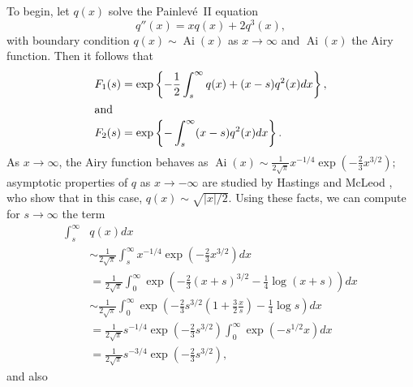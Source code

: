 \documentclass[final]{IEEEtran} %
\newcommand{\half}{\frac{1}{2}}
\DeclareMathOperator*{\Ai}{Ai}
\begin{document}
To begin, let $q(x)$ solve the Painlev\'e~II equation
\[
    q''(x) = x q(x) + 2 q^3(x),
\]
with boundary condition $q(x) \sim \Ai(x)$ as $x \to \infty$ and $\Ai(x)$ the Airy function. Then it follows that
\begin{align*}
    F_1(s)
        &= \exp \left\{
            -\half \int_s^\infty q(x) + (x - s) q^2(x) dx
        \right\}, \\
\intertext{and}
    F_2(s)
        &= \exp \left\{
            - \int_s^\infty (x - s) q^2(x) dx
        \right\}.
\end{align*}
As $x \to \infty$, the Airy function behaves as
\(
    \Ai(x)
        \sim \frac{1}{2\sqrt{\pi}} x^{-1/4}
             \exp \left( -\frac{2}{3} x^{3/2} \right);
\)
asymptotic properties of $q$ as $x \to -\infty$ are studied by Hastings and McLeod \cite{hastings1980bvp}, who show that in this case,
\(
    q(x) \sim \sqrt{ |x| / 2 }.
\)
Using these facts, we can compute for $s \to \infty$ the term
\begin{align*}
    \int_s^\infty & q(x) dx \\
        & \sim \frac{1}{2 \sqrt{\pi}}
              \int_s^\infty
                   x^{-1/4} \exp\left( -\frac{2}{3} x^{3/2} \right) dx \\
        &= \frac{1}{2 \sqrt{\pi}}
           \int_0^\infty
               \exp\left(
                   -\frac{2}{3} (x + s)^{3/2} - \frac{1}{4} \log (x + s)
               \right) dx \\
        &\sim \frac{1}{2 \sqrt{\pi}}
              \int_0^\infty
                  \exp\left(
                      -\frac{2}{3} s^{3/2}
                      \left(
                          1 + \frac{3}{2} \frac{x}{s}
                      \right)
                      - \frac{1}{4} \log s
                  \right)
                  dx \\
        &= \frac{1}{2 \sqrt{\pi}} s^{-1/4}
           \exp\left( -\frac{2}{3} s^{3/2} \right)
           \int_0^\infty \exp\left( -s^{1/2} x \right) dx \\
        &= \frac{1}{2 \sqrt{\pi}} s^{-3/4}
           \exp\left( -\frac{2}{3} s^{3/2} \right) ,
\end{align*}
and also
\end{document}
